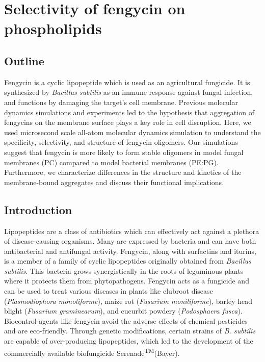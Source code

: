 \chapter{Selectivity of fengycin on phospholipids}
\label{c:chapter2}

\section{Outline}
\label{s:ch2_abstract}
Fengycin is a cyclic lipopeptide which is used as an
agricultural fungicide. It is synthesized by
\textit{Bacillus subtilis} as an immune response
against fungal infection, and functions by damaging
the target's cell membrane. Previous molecular dynamics
simulations and experiments led to the hypothesis that aggregation
of fengycins on the membrane surface plays a key role
in cell disruption. Here, we used microsecond scale
all-atom molecular dynamics simulation to understand
the specificity, selectivity, and structure of
fengycin oligomers. Our simulations suggest that
fengycin is more likely to form stable oligomers in
model fungal membranes (PC) compared to model
bacterial membranes (PE:PG). Furthermore, we
characterize differences in the structure and
kinetics of the membrane-bound aggregates and
discuss their functional implications.

\section{Introduction}
\label{s:ch2_intro}
Lipopeptides are a class of antibiotics which can effectively act against a
plethora of disease-causing organisms.\cite{Jacques2007} Many are
expressed by bacteria and can have both antibacterial and antifungal activity.
Fengycin, along with surfactins and iturins, is a member of a family of cyclic
lipopeptides originally obtained from \textit{Bacillus subtilis}. This bacteria
grows synergistically in the roots of leguminous plants where it protects them from
phytopathogens.\cite{Thonart2005} Fengycin acts as a fungicide and can be used
to treat various diseases in plants like clubroot disease (\textit{Plasmodiophora monoliforme}),
maize rot (\textit{Fusarium moniliforme}), barley
head blight (\textit{Fusarium graminearum}), and cucurbit powdery (\textit{Podosphaera fusca}).
\cite{Jung1986,Long2013,Yang2007,Chan2009,RomeroPerez2007} Biocontrol agents
like fengycin avoid the adverse effects of chemical pesticides and are
eco-friendly. Through genetic modifications, certain strains of \textit{B.
subtilis} are capable of over-producing lipopeptides, which led to the
development of the commercially available biofungicide
Serenade\textsuperscript{TM}(Bayer).

